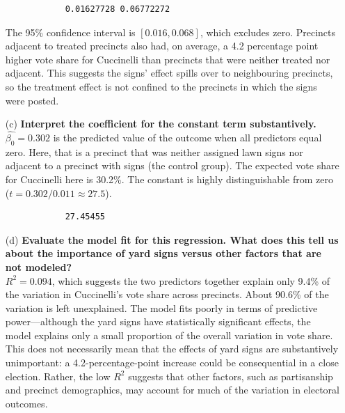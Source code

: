 \documentclass[12pt,letterpaper]{article}
\begin{document}
\begin{enumerate}
		
		\begin{verbatim}
			0.01627728 0.06772272
		\end{verbatim}
			
			\noindent The 95\% confidence interval is $[0.016, 0.068]$, which excludes zero. Precincts adjacent to treated precincts also had, on average, a 4.2 percentage point higher vote share for Cuccinelli than precincts that were neither treated nor adjacent. This suggests the signs' effect spills over to neighbouring precincts, so the treatment effect is not confined to the precincts in which the signs were posted.
		
	\vspace{1cm}
	\item [(c)] \textbf{Interpret the coefficient for the constant term substantively.} \\
		
		\noindent $\hat{\beta_0} = 0.302$ is the predicted value of the outcome when all predictors equal zero. Here, that is a precinct that was neither assigned lawn signs nor adjacent to a precinct with signs (the control group). The expected vote share for Cuccinelli here is 30.2\%. The constant is highly distinguishable from zero ($t = 0.302/0.011 \approx 27.5$). \\
		
		
		\begin{verbatim}
			27.45455
		\end{verbatim}
		
	\vspace{.5cm}
	\item [(d)] \textbf{Evaluate the model fit for this regression. What does this	tell us about the importance of yard signs versus other factors that are not modeled?} \\
		
		\noindent $R^2 = 0.094$, which suggests the two predictors together explain only 9.4\% of the variation in Cuccinelli's vote share across precincts. About 90.6\% of the variation is left unexplained. The model fits poorly in terms of predictive power—although the yard signs have statistically significant effects, the model explains only a small proportion of the overall variation in vote share. This does not necessarily mean that the effects of yard signs are substantively unimportant: a 4.2-percentage-point increase could be consequential in a close election. Rather, the low \(R^2\) suggests that other factors, such as partisanship and precinct demographics, may account for much of the variation in electoral outcomes.
		
\end{enumerate}  
\end{document}
